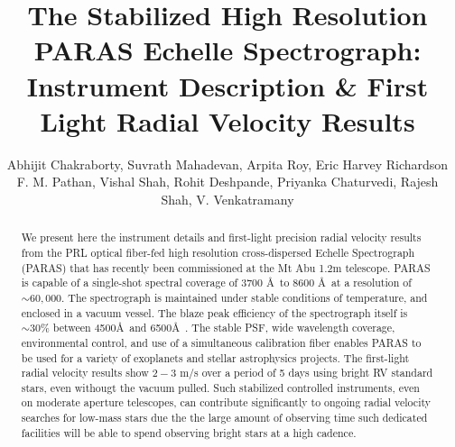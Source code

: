 \documentclass[12pt,preprint]{emulateapj}
\begin{document}
\title{The Stabilized High Resolution PARAS Echelle Spectrograph: Instrument Description \& First Light Radial Velocity Results}

\author{
  Abhijit Chakraborty,
  Suvrath Mahadevan,
  Arpita Roy,
  Eric Harvey Richardson
  F. M. Pathan,
  Vishal Shah,
  Rohit Deshpande,
  Priyanka Chaturvedi,
  Rajesh Shah,
  V. Venkatramany
}
\begin{abstract}
We present here the instrument details and first-light precision radial velocity results from the PRL optical fiber-fed high
resolution cross-dispersed Echelle Spectrograph (PARAS) that has recently been commissioned at the Mt Abu 1.2m telescope. PARAS is capable of a single-shot spectral coverage of
3700  \AA\ to 8600  \AA\ at a resolution of $\sim60,000$. The spectrograph is maintained under stable conditions
of temperature, and enclosed in a vacuum vessel. The blaze peak efficiency of the spectrograph itself is  $\sim 30\%$ between 4500\AA\ and 6500\AA\ .  The stable PSF, wide wavelength coverage, environmental control, and use of a simultaneous calibration fiber enables PARAS to be used for a variety of exoplanets and stellar astrophysics projects.  The first-light radial velocity results show $2-3$ m/s over a period of 5 days using bright RV standard stars, even withougt the vacuum pulled. Such stabilized controlled instruments, even on moderate aperture telescopes, can contribute significantly to ongoing radial velocity searches for low-mass stars due the the large amount of observing time such dedicated facilities will be able to spend observing bright stars at a high cadence.
\end{abstract}

\end{document}
